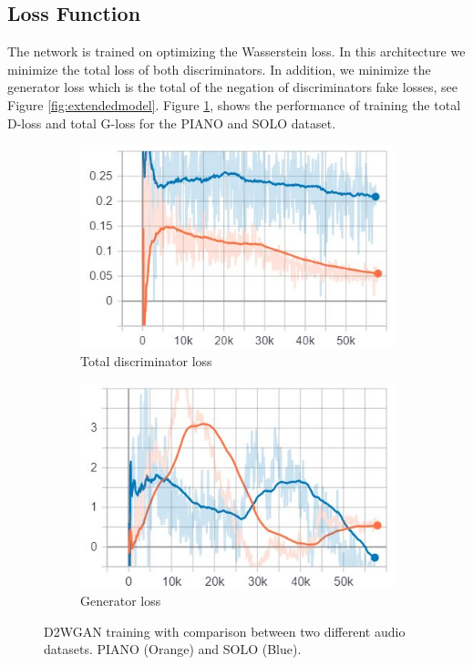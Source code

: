 \documentclass{article} %
\begin{document}
\subsection{Loss Function}
The network is trained on optimizing the Wasserstein loss. In this architecture we minimize the total loss of both discriminators. In addition, we minimize the generator loss which is the total of the negation of discriminators fake losses, see Figure \ref{fig:extendedmodel}. Figure \ref{fig:loss}, shows the performance of training the total D-loss and total G-loss for the PIANO and SOLO dataset. 

\begin{figure}[h!]
  \centering
  \begin{subfigure}[b]{0.4\linewidth}
    \includegraphics[width=\linewidth]{images/extend/extend_neg_loss.jpg}
    \caption{Total discriminator loss}
  \end{subfigure}
  \begin{subfigure}[b]{0.4\linewidth}
    \includegraphics[width=\linewidth]{images/extend/extend_gen_loss.jpg}
    \caption{Generator loss}
  \end{subfigure}
  \caption{D2WGAN training with comparison between two different audio datasets. PIANO (Orange) and SOLO (Blue).}
  \label{fig:loss}
\end{figure}
\end{document}
